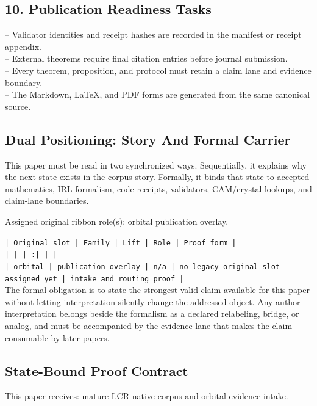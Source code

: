 \documentclass[11pt]{article}
\begin{document}
\subsection*{10. Publication Readiness Tasks}

\noindent{}-- Validator identities and receipt hashes are recorded in the manifest or receipt appendix.\\
\noindent{}-- External theorems require final citation entries before journal submission.\\
\noindent{}-- Every theorem, proposition, and protocol must retain a claim lane and evidence boundary.\\
\noindent{}-- The Markdown, LaTeX, and PDF forms are generated from the same canonical source.\\

\subsection*{Dual Positioning: Story And Formal Carrier}

This paper must be read in two synchronized ways. Sequentially, it explains why
the next state exists in the corpus story. Formally, it binds that state to
accepted mathematics, IRL formalism, code receipts, validators, CAM/crystal
lookups, and claim-lane boundaries.

Assigned original ribbon role(s): orbital publication overlay.

\noindent\texttt{| Original slot | Family | Lift | Role | Proof form |}\\
\noindent\texttt{|---|---|---:|---|---|}\\
\noindent\texttt{| orbital | publication overlay | n/a | no legacy original slot assigned yet | intake and routing proof |}\\

The formal obligation is to state the strongest valid claim available for this
paper without letting interpretation silently change the addressed object. Any
author interpretation belongs beside the formalism as a declared relabeling,
bridge, or analog, and must be accompanied by the evidence lane that makes the
claim consumable by later papers.

\subsection*{State-Bound Proof Contract}

This paper receives: mature LCR-native corpus and orbital evidence intake.
\end{document}
